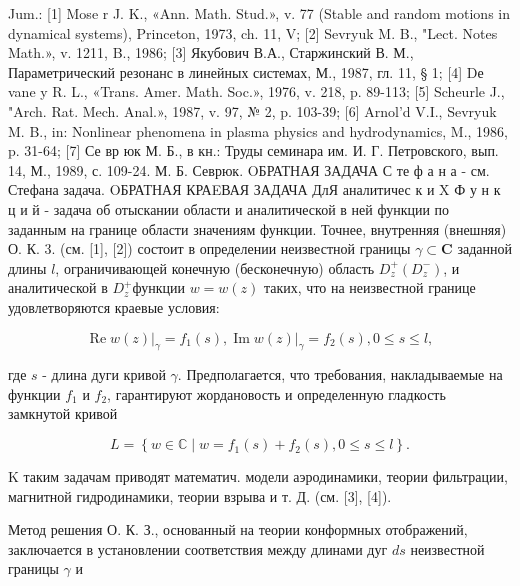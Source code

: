 \documentclass[10pt]{article}
\begin{document}
Jum.: [1] Mose r J. K., «Ann. Math. Stud.», v. 77 (Stable and random motions in dynamical systems), Princeton, 1973, ch. 11, V; [2] Sevryuk M. B., "Lect. Notes Math.», v. 1211, B., 1986; [3] Якубович В.А., Старжинский В. М., Параметрический резонанс в линейных системах, М., 1987, гл. 11, § 1; [4] Dе vane y R. L., «Trans. Amer. Math. Soc.», 1976, v. 218, p. 89-113; [5] Scheurle J., "Arch. Rat. Mech. Anal.», 1987, v. 97, № 2, p. 103-39; [6] Arnol'd V.I., Sevryuk M. B., in: Nonlinear phenomena in plasma physics and hydrodynamics, M., 1986, p. 31-64; [7] Се вр юк М. Б., в кн.: Труды семинара им. И. Г. Петровского, вып. 14, М., 1989, с. 109-24. М. Б. Севрюк. OБРАТНАЯ ЗАДАЧА С те ф а н а - см. Стефана задача. OБРАТНАЯ КРАEВАЯ ЗАДАЧА ДлЯ аналитичес к и X Ф у н к ц и й - задача об отыскании области и аналитической в ней функции по заданным на границе области значениям функции. Точнее, внутренняя (внешняя) О. К. 3. (см. [1], [2]) состоит в определении неизвестной границы $\gamma \subset \mathbf{C}$ заданной длины $l$, ограничивающей конечную (бесконечную) область $D_{z}^{+}\left(D_{z}^{-}\right)$, и аналитической в $D_{z}^{+}$функции $w=w(z)$ таких, что на неизвестной границе удовлетворяются краевые условия:



\[

\left.\operatorname{Re} w(z)\right|_{\gamma}=f_{1}(s),\left.\operatorname{Im} w(z)\right|_{\gamma}=f_{2}(s), 0 \leqslant s \leqslant l,

\]



где $s$ - длина дуги кривой $\gamma$. Предполагается, что требования, накладываемые на функции $f_{1}$ и $f_{2}$, гарантируют жордановость и определенную гладкость замкнутой кривой



\[

L=\left\{w \in \mathbb{C} \mid w=f_{1}(s)+f_{2}(s), 0 \leqslant s \leqslant l\right\} .

\]



$\mathrm{K}$ таким задачам приводят математич. модели аэродинамики, теории фильтрации, магнитной гидродинамики, теории взрыва и т. Д. (см. [3], [4]).



Метод решения О. К. З., основанный на теории конформных отображений, заключается в установлении соответствия между длинами дуг $d s$ неизвестной границы $\gamma$ и
\end{document}
